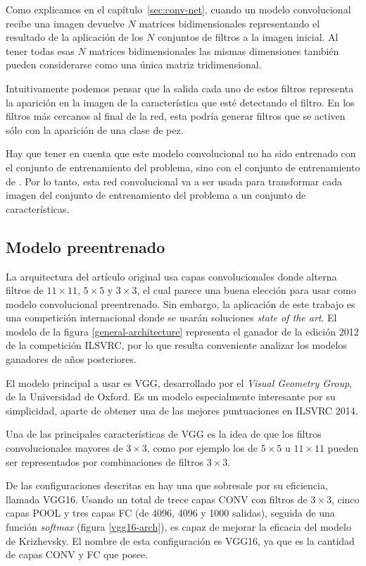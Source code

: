 Como explicamos en el capítulo~\ref{sec:conv-net}, cuando un modelo convolucional recibe una imagen devuelve $N$ matrices bidimensionales representando el resultado de la aplicación de los $N$ conjuntos de filtros a la imagen inicial. Al tener todas esas $N$ matrices bidimensionales las mismas dimensiones también pueden considerarse como una única matriz tridimensional.

Intuitivamente podemos pensar que la salida cada uno de estos filtros representa la aparición en la imagen de la característica que esté detectando el filtro. En los filtros más cercanos al final de la red, esta podría generar filtros que se activen sólo con la aparición de una clase de pez.

Hay que tener en cuenta que este modelo convolucional no ha sido entrenado con el conjunto de entrenamiento del problema, sino con el conjunto de entrenamiento de \parencite{imagenet}. Por lo tanto, esta red convolucional va a ser usada para transformar cada imagen del conjunto de entrenamiento del problema a un conjunto de características.

\subsection{Modelo preentrenado}
\label{sec:vgg}

La arquitectura del artículo original \parencite{krizhevsky2012imagenet} usa capas convolucionales donde alterna filtros de $11\times11$, $5\times5$ y $3\times3$, el cual parece una buena elección para usar como modelo convolucional preentrenado. Sin embargo, la aplicación de este trabajo es una competición internacional donde se usarán soluciones \textit{state of the art}. El modelo de la figura \ref{general-architecture} representa el ganador de la edición 2012 de la competición ILSVRC, por lo que resulta conveniente analizar los modelos ganadores de años posteriores.

El modelo principal a usar es VGG, desarrollado por el \textit{Visual Geometry Group}, de la Universidad de Oxford. Es un modelo especialmente interesante por su simplicidad, aparte de obtener una de las mejores puntuaciones en ILSVRC 2014.


Una de las principales características de VGG es la idea de que los filtros convolucionales mayores de $3\times3$, como por ejemplo los de $5\times5$ u $11\times11$ pueden ser representados por combinaciones de filtros $3\times3$.

De las configuraciones descritas en \parencite{simonyan} hay una que sobresale por su eficiencia, llamada VGG16. Usando un total de trece capas CONV con filtros de $3\times3$, cinco capas POOL y tres capas FC (de 4096, 4096 y 1000 salidas), seguida de una función \textit{softmax} (figura \ref{vgg16-arch}), es capaz de mejorar la eficacia del modelo de Krizhevsky. El nombre de esta configuración es VGG16, ya que es la cantidad de capas CONV y FC que posee.

